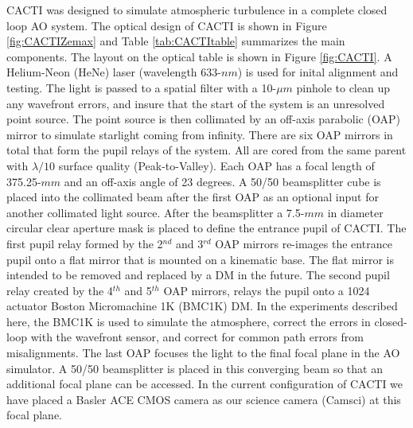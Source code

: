 CACTI was designed to simulate atmospheric turbulence in a complete closed loop AO system. The optical design of  CACTI  is shown in Figure \ref{fig:CACTIZemax} and Table \ref{tab:CACTItable} summarizes the main components. The layout on the optical table is shown in Figure \ref{fig:CACTI}. A Helium-Neon (HeNe) laser (wavelength 633-$nm$) is used for inital alignment and testing.  The light is passed to a spatial filter with a 10-$\mu m$ pinhole to clean up any wavefront errors, and insure that the start of the system is an unresolved point source. The point source is then collimated by an off-axis parabolic (OAP) mirror to simulate starlight coming from infinity. There are six OAP mirrors in total that form the pupil relays of the system. All are cored from the same parent with $\lambda /10$ surface quality (Peak-to-Valley). Each OAP has a focal length of 375.25-$mm$ and an off-axis angle of 23 degrees. A 50/50 beamsplitter cube is placed into the collimated beam after the first OAP as an optional input for another collimated light source. After the beamsplitter a 7.5-$mm$ in diameter circular clear aperture mask is placed to define the entrance pupil of CACTI. The first pupil relay formed by the 2$^{nd}$ and 3$^{rd}$ OAP mirrors re-images the entrance pupil onto a flat mirror that is mounted on a kinematic base. The flat mirror is intended to be removed and replaced by a DM in the future. The second pupil relay created by the 4$^{th}$ and 5$^{th}$ OAP mirrors, relays the pupil onto a 1024 actuator Boston Micromachine 1K (BMC1K) DM. In the experiments described here, the BMC1K is used to simulate the atmosphere, correct the errors in closed-loop with the wavefront sensor, and correct for common path errors from misalignments. The last OAP focuses the light to the final focal plane in the AO simulator. A 50/50 beamsplitter is placed in this converging beam so that an additional focal plane can be accessed. In the current configuration of CACTI we have placed a Basler ACE CMOS camera as our science camera (Camsci) at this focal plane.


